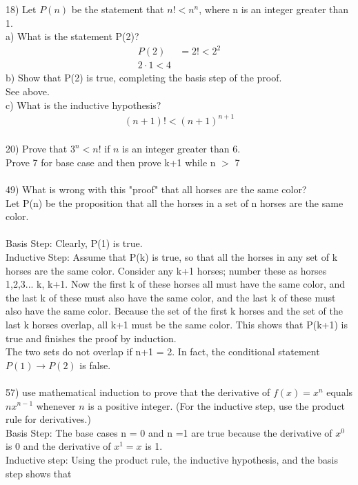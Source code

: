 \documentclass{article}
\begin{document}
\begin{flushleft}
\setlength\parindent{0pt}18) Let $P(n)$ be the statement that $n! < n^n$, where n is an integer greater than 1. \\
\setlength\parindent{0pt}a) What is the statement P(2)? 
\begin{align*}
P(2) &= 2! < 2^2 \\
2 \cdot 1 < 4 
\end{align*}
\setlength\parindent{0pt}b) Show that P(2) is true, completing the basis step of the proof. \\
\setlength\parindent{24pt}See above. \\
\setlength\parindent{0pt}c) What is the inductive hypothesis?
\begin{align*}
(n+1)! < (n+1)^{n+1}
\end{align*}
~\\

\setlength\parindent{0pt}20) Prove that $3^n < n!$ if $n$ is an integer greater than 6. \\
Prove 7 for base case and then prove k+1 while n $>$ 7\\
~\\
\setlength\parindent{0pt}49) What is wrong with this "proof" that all horses are the same color? \\
Let P(n) be the proposition that all the horses in a set of n horses are the same color. \\
~\\
Basis Step: Clearly, P(1) is true. \\
Inductive Step:  Assume that P(k) is true, so that all the horses in any set of k horses are the same color.  Consider any k+1 horses; number these as horses 1,2,3... k, k+1.  Now the first k of these horses all must have the same color, and the last k of these must also have the same color, and the last k of these must also have the same color.  Because the set of the first k horses and the set of the last k horses overlap, all k+1 must be the same color.  This shows that P(k+1) is true and finishes the proof by induction. \\
\setlength\parindent{24pt}The two sets do not overlap if n+1 = 2.  In fact, the conditional statement $P(1) \rightarrow P(2)$ is false.  \\
~\\
\setlength\parindent{0pt}57) use mathematical induction to prove that the derivative of $f(x) = x^n$ equals $nx^{n-1}$ whenever $n$ is a positive integer.  (For the inductive step, use the product rule for derivatives.)  \\
\setlength\parindent{24pt} Basis Step:  The base cases n = 0 and n =1 are true because the derivative of $x^0$ is 0 and the derivative of $x^1 = x$ is 1.  \\
Inductive step:  Using the product rule, the inductive hypothesis, and the basis step shows that 


\end{flushleft}
\end{document}

